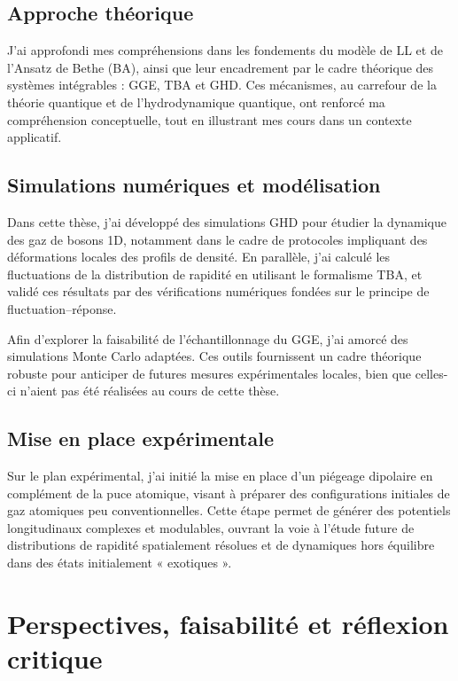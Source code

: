 \subsection*{Approche théorique}
J’ai approfondi mes compréhensions dans les fondements du modèle de \acrlong{LL} et de l’Ansatz de Bethe (\gls{BA}), ainsi que leur encadrement par le cadre théorique des systèmes intégrables : \gls{GGE}, \gls{TBA} et \gls{GHD}. Ces mécanismes, au carrefour de la théorie quantique et de l’hydrodynamique quantique, ont renforcé ma compréhension conceptuelle, tout en illustrant mes cours dans un contexte applicatif.


\subsection*{Simulations numériques et modélisation}
Dans cette thèse, j’ai développé des simulations \gls{GHD} pour étudier la dynamique des gaz de bosons 1D, notamment dans le cadre de protocoles impliquant des déformations locales des profils de densité. En parallèle, j’ai calculé les fluctuations de la distribution de rapidité en utilisant le formalisme \gls{TBA}, et validé ces résultats par des vérifications numériques fondées sur le principe de fluctuation–réponse.  

Afin d’explorer la faisabilité de l’échantillonnage du \gls{GGE}, j’ai amorcé des simulations Monte Carlo adaptées. Ces outils fournissent un cadre théorique robuste pour anticiper de futures mesures expérimentales locales, bien que celles-ci n’aient pas été réalisées au cours de cette thèse.


\subsection*{Mise en place expérimentale}
Sur le plan expérimental, j’ai initié la mise en place d’un piégeage dipolaire en complément de la puce atomique, visant à préparer des configurations initiales de gaz atomiques peu conventionnelles. Cette étape permet de générer des potentiels longitudinaux complexes et modulables, ouvrant la voie à l’étude future de distributions de rapidité spatialement résolues et de dynamiques hors équilibre dans des états initialement « exotiques ».


\section*{Perspectives, faisabilité et réflexion critique}


